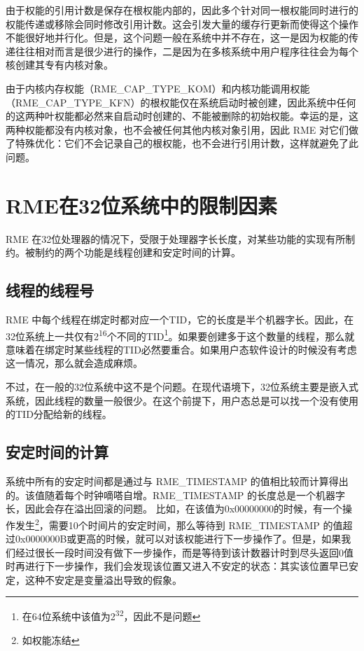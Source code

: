 由于权能的引用计数是保存在根权能内部的，因此多个针对同一根权能同时进行的权能传递或移除会同时修改引用计数。这会引发大量的缓存行更新而使得这个操作不能很好地并行化。但是，这个问题一般在系统中并不存在，这一是因为权能的传递往往相对而言是很少进行的操作，二是因为在多核系统中用户程序往往会为每个核创建其专有内核对象。

由于内核内存权能（RME\_CAP\_TYPE\_KOM）和内核功能调用权能（RME\_CAP\_TYPE\_KFN）的根权能仅在系统启动时被创建，因此系统中任何的这两种叶权能都必然来自启动时创建的、不能被删除的初始权能。幸运的是，这两种权能都没有内核对象，也不会被任何其他内核对象引用，因此 RME 对它们做了特殊优化：它们不会记录自己的根权能，也不会进行引用计数，这样就避免了此问题。

\section{RME在32位系统中的限制因素}\label{sec:9-32bit-limitations}

RME 在32位处理器的情况下，受限于处理器字长长度，对某些功能的实现有所制约。被制约的两个功能是线程创建和安定时间的计算。

\subsection{线程的线程号}\label{subsec:9-thread-id}

RME 中每个线程在绑定时都对应一个TID，它的长度是半个机器字长。因此，在32位系统上一共仅有2\textsuperscript{16}个不同的TID\footnote{在64位系统中该值为2\textsuperscript{32}，因此不是问题}。如果要创建多于这个数量的线程，那么就意味着在绑定时某些线程的TID必然要重合。如果用户态软件设计的时候没有考虑这一情况，那么就会造成麻烦。

不过，在一般的32位系统中这不是个问题。在现代语境下，32位系统主要是嵌入式系统，因此线程的数量一般很少。在这个前提下，用户态总是可以找一个没有使用的TID分配给新的线程。

\subsection{安定时间的计算}\label{subsec:9-quiescence-time}

系统中所有的安定时间都是通过与 RME\_TIMESTAMP 的值相比较而计算得出的。该值随着每个时钟嘀嗒自增。RME\_TIMESTAMP 的长度总是一个机器字长，因此会存在溢出回滚的问题。
比如，在该值为0x00000000的时候，有一个操作发生\footnote{如权能冻结}，需要10个时间片的安定时间，那么等待到 RME\_TIMESTAMP 的值超过0x0000000B或更高的时候，就可以对该权能进行下一步操作了。但是，如果我们经过很长一段时间没有做下一步操作，而是等待到该计数器计时到尽头返回0值时再进行下一步操作，我们会发现该位置又进入不安定的状态：其实该位置早已安定，这种不安定是变量溢出导致的假象。

